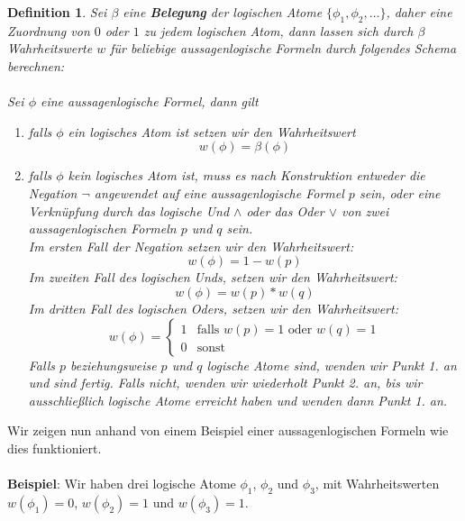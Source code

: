 \documentclass[11pt,a4paper,leqno]{report}
\newtheorem{definition}[theorem]{Definition}
\numberwithin{equation}{chapter}
\begin{document}
\begin{definition}
	Sei $\beta$ eine \textbf{Belegung} der logischen Atome $\{\phi_1, \phi_2, \dots\}$, daher eine Zuordnung von $0$ oder $1$ zu jedem logischen Atom, dann lassen sich durch $\beta$ Wahrheitswerte $w$ für beliebige aussagenlogische Formeln durch folgendes Schema berechnen:\\
	\\
	Sei $\phi$ eine aussagenlogische Formel, dann gilt
	\begin{enumerate}
		\item falls $\phi$ ein logisches Atom ist setzen wir den Wahrheitswert 
		\begin{equation}
			w(\phi) = \beta(\phi)
		\end{equation}
		\item falls $\phi$ kein logisches Atom ist, muss es nach Konstruktion entweder die Negation $\neg$ angewendet auf eine aussagenlogische Formel $p$ sein, oder eine Verknüpfung durch das logische Und $\wedge$ oder das Oder $\vee$ von zwei aussagenlogischen Formeln $p$ und $q$ sein.\\
		Im ersten Fall der Negation setzen wir den Wahrheitswert: 
		\begin{equation}
			w(\phi) = 1 - w(p)
		\end{equation}
		Im zweiten Fall des logischen Unds, setzen wir den Wahrheitswert: 
		\begin{equation}
			w(\phi) = w(p) * w(q)
		\end{equation}
		Im dritten Fall des logischen Oders, setzen wir den Wahrheitswert: 
		\begin{equation}
			w(\phi) = 
			\begin{cases} 
			1 & \text{falls }w(p)=1\text{ oder }w(q)=1\\
			0 & \text{sonst}
			\end{cases}
		\end{equation}
		Falls $p$ beziehungsweise $p$ und $q$ logische Atome sind, wenden wir Punkt 1. an und sind fertig. Falls nicht, wenden wir wiederholt Punkt 2. an, bis wir ausschließlich logische Atome erreicht haben und wenden dann Punkt 1. an.
	\end{enumerate}
\end{definition}
Wir zeigen nun anhand von einem Beispiel einer aussagenlogischen Formeln wie dies funktioniert.\\
\\
\textbf{Beispiel}: Wir haben drei logische Atome $\phi_1$, $\phi_2$ und $\phi_3$, mit Wahrheitswerten $w(\phi_1)=0$, $w(\phi_2)=1$ und $w(\phi_3)=1$.\\
\end{document}
